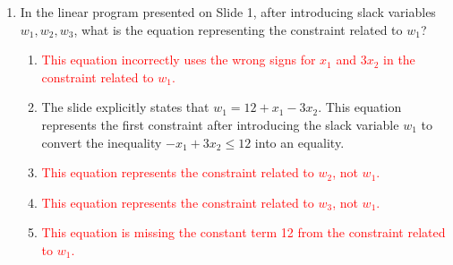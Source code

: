 \documentclass{article}%
\newcommand{\incorrect}[1]{\textcolor{red}{#1}}
\begin{document}
\begin{enumerate}
\begin{enumerate}
\item \incorrect{While the simplex method uses slack variables, finding an initial feasible solution when the origin is infeasible requires techniques like the two-phase simplex method or the big M method, which go beyond simply adding slack variables.}%
\item \incorrect{The simplex method uses slack variables to move between vertices of the feasible region, but the optimal solution is not solely determined by the slack variables themselves.}%
\item \incorrect{Slack variables are used in linear programming regardless of the number of variables. They are fundamental to converting inequalities to equalities, a necessary step for the simplex method.}%
\end{enumerate}%
\vspace{1em}%
\item In the linear program presented on Slide 1, after introducing slack variables $w_1, w_2, w_3$, what is the equation representing the constraint related to $w_1$?%
\begin{enumerate}%
\item \incorrect{This equation incorrectly uses the wrong signs for $x_1$ and $3x_2$ in the constraint related to $w_1$.}%
\item The slide explicitly states that $w_1 = 12 + x_1 - 3x_2$. This equation represents the first constraint after introducing the slack variable $w_1$ to convert the inequality $-x_1 + 3x_2 \le 12$ into an equality.%
\item \incorrect{This equation represents the constraint related to $w_2$, not $w_1$.}%
\item \incorrect{This equation represents the constraint related to $w_3$, not $w_1$.}%
\item \incorrect{This equation is missing the constant term 12 from the constraint related to $w_1$.}%
\end{enumerate}%
\vspace{1em}%
\end{enumerate}

%
\end{document}

